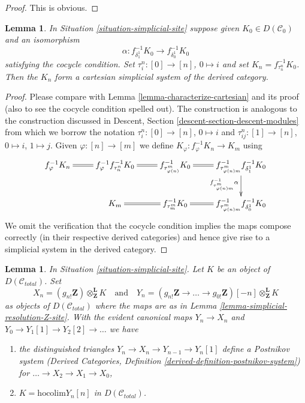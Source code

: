 \documentclass{stacks-project}
\theoremstyle{plain}
\newtheorem{lemma}[subsection]{Lemma}
\theoremstyle{definition}
\theoremstyle{remark}
\numberwithin{equation}{subsection}
\begin{document}
\begin{proof}
This is obvious.
\end{proof}

\begin{lemma}
\label{lemma-construct-cartesian-objects-derived}
In Situation \ref{situation-simplicial-site}
suppose given $K_0 \in D(\mathcal{C}_0)$ and an isomorphism
$$
\alpha :
f_{\delta_1^1}^{-1}K_0
\longrightarrow
f_{\delta_0^1}^{-1}K_0
$$
satisfying the cocycle condition. Set
$\tau^n_i : [0] \to [n]$, $0 \mapsto i$ and
set $K_n = f_{\tau^n_n}^{-1}K_0$. Then the $K_n$
form a cartesian simplicial system of the derived category.
\end{lemma}

\begin{proof}
Please compare with Lemma \ref{lemma-characterize-cartesian}
and its proof (also to see the cocycle condition spelled out).
The construction is analogous to the construction discussed in
Descent, Section \ref{descent-section-descent-modules} from which
we borrow the notation $\tau^n_i : [0] \to [n]$, $0 \mapsto i$ and
$\tau^n_{ij} : [1] \to [n]$, $0 \mapsto i$, $1 \mapsto j$.
Given $\varphi : [n] \to [m]$ we define
$K_\varphi : f_\varphi^{-1}K_n \to K_m$
using
$$
\xymatrix{
f_\varphi^{-1}K_n \ar@{=}[r] &
f_\varphi^{-1} f_{\tau^n_n}^{-1}K_0 \ar@{=}[r] &
f_{\tau^m_{\varphi(n)}}^{-1}K_0 \ar@{=}[r] &
f_{\tau^m_{\varphi(n)m}}^{-1}f_{\delta^1_1}^{-1}K_0
\ar[d]_{f_{\tau^m_{\varphi(n)m}}^{-1}\alpha} \\
&
K_m \ar@{=}[r] &
f_{\tau^m_m}^{-1}K_0 \ar@{=}[r] &
f_{\tau^m_{\varphi(n)m}}^{-1}f_{\delta^1_0}^{-1}K_0
}
$$
We omit the verification that the cocycle condition
implies the maps compose correctly (in their respective
derived categories) and hence give rise to a
simplicial system in the derived category.
\end{proof}

\begin{lemma}
\label{lemma-abelian-postnikov}
In Situation \ref{situation-simplicial-site}. Let $K$ be
an object of $D(\mathcal{C}_{total})$. Set
$$
X_n = (g_{n!}\mathbf{Z})
\otimes^\mathbf{L}_\mathbf{Z} K
\quad\text{and}\quad
Y_n =
(g_{n!}\mathbf{Z} \to \ldots \to g_{0!}\mathbf{Z})[-n]
\otimes^\mathbf{L}_\mathbf{Z} K
$$
as objects of $D(\mathcal{C}_{total})$ where the maps are
as in Lemma \ref{lemma-simplicial-resolution-Z-site}.
With the evident canonical maps $Y_n \to X_n$ and
$Y_0 \to Y_1[1] \to Y_2[2] \to \ldots$ we have
\begin{enumerate}
\item the distinguished triangles $Y_n \to X_n \to Y_{n - 1} \to Y_n[1]$
define a Postnikov system
(Derived Categories, Definition \ref{derived-definition-postnikov-system})
for $\ldots \to X_2 \to X_1 \to X_0$,
\item $K = \text{hocolim} Y_n[n]$ in $D(\mathcal{C}_{total})$.
\end{enumerate}
\end{lemma}
\end{document}
